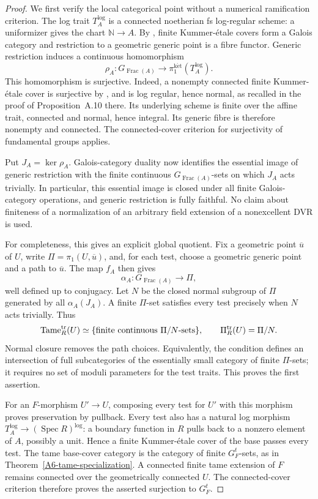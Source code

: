 \begin{proof}
We first verify the local categorical point without a numerical
ramification criterion. The log trait $T_A^{\log}$ is a connected
noetherian fs log-regular scheme: a uniformizer gives the chart
$\mathbb N\to A$. By
\cite[Appendix, Theorems~A.1--A.2, pp.~61--65]{HoshiLog2009A567},
finite Kummer-\'etale covers form a Galois category and restriction
to a geometric generic point is a fibre functor. Generic restriction
induces a continuous homomorphism
\[
 \rho_A:G_{\operatorname{Frac}(A)}
          \longrightarrow\pi_1^{\mathrm{k\acute et}}(T_A^{\log}).
\]
This homomorphism is surjective. Indeed, a nonempty connected finite
Kummer-\'etale cover is surjective by
\cite[Proposition~A.6, p.~56]{HoshiLog2009A567}, and is log regular,
hence normal, as recalled in the proof of Proposition~A.10 there.
Its underlying scheme is finite over the affine trait, connected
and normal, hence integral. Its generic fibre is therefore nonempty
and connected. The connected-cover criterion for surjectivity of
fundamental groups applies.

Put $J_A=\ker\rho_A$. Galois-category duality now identifies the
essential image of generic restriction with the finite continuous
$G_{\operatorname{Frac}(A)}$-sets on which $J_A$ acts trivially.
In particular, this essential image is closed under all finite
Galois-category operations, and generic restriction is fully faithful.
No claim about finiteness of a normalization of an arbitrary field
extension of a nonexcellent DVR is used.

For completeness, this gives an explicit global quotient. Fix a
geometric point $\overline u$ of $U$, write $\Pi=\pi_1(U,\overline u)$,
and, for each test, choose a geometric generic point and a path to
$\overline u$. The map $f_A$ then gives
\[
 \alpha_A:G_{\operatorname{Frac}(A)}\longrightarrow\Pi,
\]
well defined up to conjugacy. Let $N$ be the closed normal subgroup
of $\Pi$ generated by all $\alpha_A(J_A)$.
A finite $\Pi$-set satisfies every test precisely when $N$ acts
trivially. Thus
\[
 \operatorname{Tame}^{\rm tr}_R(U)
   \simeq\{\text{finite continuous }\Pi/N\text{-sets}\},
 \qquad \Pi^{\rm tr}_R(U)=\Pi/N.
\]
Normal closure removes the path choices. Equivalently, the condition
defines an intersection of full subcategories of the essentially
small category of finite $\Pi$-sets; it requires no set of moduli
parameters for the test traits. This proves the first assertion.

For an $F$-morphism $U'\to U$, composing every test for $U'$ with
this morphism proves preservation by pullback. Every test also has
a natural log morphism
$T_A^{\log}\to(\operatorname{Spec}R)^{\log}$: a boundary function
in $R$ pulls back to a nonzero element of $A$, possibly a unit.
Hence a finite Kummer-\'etale cover of the base passes every test.
The tame base-cover category is the category of finite $G_F^t$-sets,
as in Theorem~\ref{A6-tame-specialization}. A connected finite tame
extension of $F$ remains connected over the geometrically connected
$U$. The connected-cover criterion therefore proves the asserted
surjection to $G_F^t$.


\end{proof}

